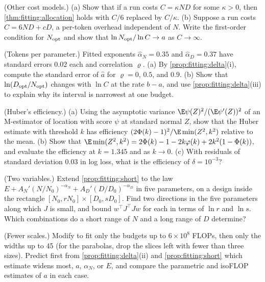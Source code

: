 \begin{refsection}
\begin{exercises}
\item \consolidation (Other cost models.) (a) Show that if a run costs $C=\kappa ND$ for some $\kappa>0$, then \cref{thm:fitting:allocation} holds with $C/6$ replaced by $C/\kappa$. (b) Suppose a run costs $C=6ND+cD$, a per-token overhead independent of $N$. Write the first-order condition for $N_{\mathrm{opt}}$ and show that $\ln N_{\mathrm{opt}}/\ln C\to a$ as $C\to\infty$.\label{ex:fitting:cost}

\item \consolidation (Tokens per parameter.) Fitted exponents $\hat\alpha_N=0.35$ and $\hat\alpha_D=0.37$ have standard errors $0.02$ each and correlation $\varrho$. (a) By \cref{prop:fitting:delta}(i), compute the standard error of $\hat a$ for $\varrho=0$, $0.5$, and $0.9$. (b) Show that $\ln(D_{\mathrm{opt}}/N_{\mathrm{opt}})$ changes with $\ln C$ at the rate $b-a$, and use \cref{prop:fitting:delta}(iii) to explain why its interval is narrowest at one budget.\label{ex:fitting:tokens}

\item \consolidation (Huber's efficiency.) (a) Using the asymptotic variance $\E\psi(Z)^2/(\E\psi'(Z))^2$ of an M-estimator of location with score $\psi$ at standard normal $Z$, show that the Huber estimate with threshold $k$ has efficiency $(2\Phi(k)-1)^2/\E\min(Z^2,k^2)$ relative to the mean. (b) Show that $\E\min(Z^2,k^2)=2\Phi(k)-1-2k\varphi(k)+2k^2(1-\Phi(k))$, and evaluate the efficiency at $k=1.345$ and as $k\to0$. (c) With residuals of standard deviation $0.03$ in log loss, what is the efficiency of $\delta=10^{-3}$?\label{ex:fitting:huber}

\item \consolidation\hard (Two variables.) Extend \cref{prop:fitting:short} to the law $E+A_N'(N/N_0)^{-\alpha_N}+A_D'(D/D_0)^{-\alpha_D}$ in five parameters, on a design inside the rectangle $[N_0,rN_0]\times[D_0,sD_0]$. Find two directions in the five parameters along which $J$ is small, and bound $w^\top J^\top Jw$ for each in terms of $\ln r$ and $\ln s$. Which combinations do a short range of $N$ and a long range of $D$ determine? \label{ex:fitting:twovar}

\item \labwork (Fewer scales.) Modify  to fit only the budgets up to $6\times10^{8}$ FLOPs, then only the widths up to 45 (for the parabolas, drop the slices left with fewer than three sizes). Predict first from \cref{prop:fitting:delta}(ii) and \cref{prop:fitting:short} which estimate widens most, $a$, $\alpha_N$, or $E$, and compare the parametric and isoFLOP estimates of $a$ in each case.\label{ex:fitting:fewer}


\end{exercises}
\end{refsection}
